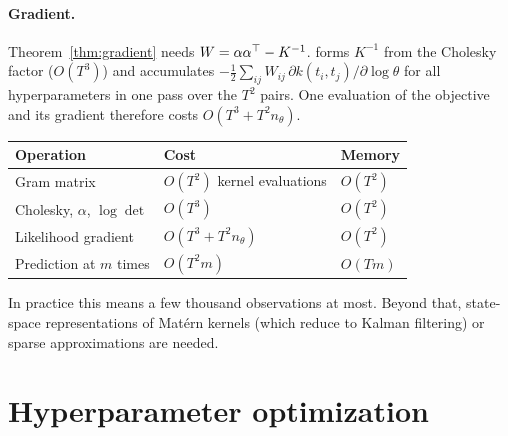 \documentclass[11pt,a4paper]{article}
\begin{document}
\paragraph{Gradient.} Theorem~\ref{thm:gradient} needs $W=\alpha\alpha^\top-K^{-1}$.
 forms $K^{-1}$ from the Cholesky factor ($O(T^3)$) and accumulates
$-\tfrac12\sum_{ij}W_{ij}\,\partial k(t_i,t_j)/\partial\log\theta$ for all
hyperparameters in one pass over the $T^2$ pairs. One evaluation of the objective
and its gradient therefore costs $O(T^3+T^2n_\theta)$.

\begin{center}
\begin{tabular}{@{}lll@{}}
\toprule
Operation & Cost & Memory \\
\midrule
Gram matrix & $O(T^2)$ kernel evaluations & $O(T^2)$ \\
Cholesky, $\alpha$, $\log\det$ & $O(T^3)$ & $O(T^2)$ \\
Likelihood gradient & $O(T^3+T^2n_\theta)$ & $O(T^2)$ \\
Prediction at $m$ times & $O(T^2m)$ & $O(Tm)$ \\
\bottomrule
\end{tabular}
\end{center}
In practice this means a few thousand observations at most. Beyond that,
state-space representations of Matérn kernels (which reduce to Kalman filtering) or sparse
approximations are needed.

\section{Hyperparameter optimization}\label{sec:optimization}
\end{document}
